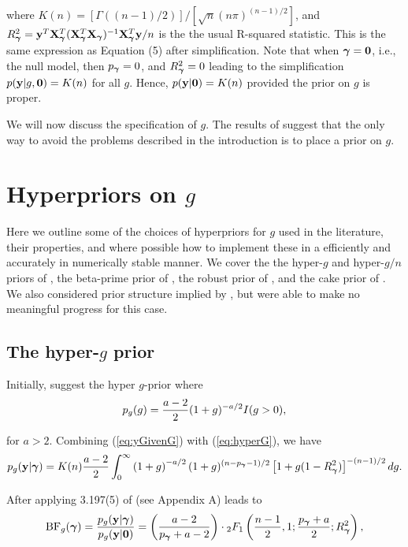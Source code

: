 \documentclass{article}[12pt]
\begin{document}
\noindent where $K(n) = [\Gamma( (n-1)/2 )]/[\sqrt{n}(n\pi)^{(n-1)/2}]$, and
$R_{\boldsymbol \gamma}^2 = {\bf y}^T{\bf X}_{\boldsymbol \gamma}^T({\bf X}_{\boldsymbol \gamma}^T{\bf X}_{\boldsymbol \gamma})^{-1}{\bf X}_{\boldsymbol \gamma}^T{\bf y}/n$ is 
the the usual R-squared statistic.
This is the same expression as \cite{Liang2008} Equation (5) 
after simplification. Note that
when ${\boldsymbol \gamma} = {\bf 0}$, i.e., the null model, then $p_{\boldsymbol \gamma} = 0$, and
$R_{\boldsymbol \gamma}^2 = 0$ leading to the simplification $p({\bf y}|g,{\bf 0}) = K(n)$
for all $g$. Hence, $p({\bf y}|{\bf 0}) = K(n)$ provided the prior on $g$ is proper.

We will now discuss the specification of $g$.
The results of \cite{Liang2008} suggest that the only way to 
avoid the problems described in the introduction is to place a prior on $g$.

\section{Hyperpriors on $g$}

Here we outline some of the choices of hyperpriors for $g$ used in the literature, their
properties, and where possible how to implement these in a efficiently and 
accurately in
numerically stable manner. We cover the 
the hyper-$g$ and hyper-$g/n$ priors of \cite{Liang2008}, the beta-prime prior
of \cite{Maruyama2011}, the robust prior of \cite{Bayarri2012}, and the cake
prior of \cite{OrmerodEtal2017}.
We also considered prior structure implied by \cite{Zellner1980}, but were able to make no
meaningful progress for this case.


\subsection{The hyper-$g$ prior}

Initially, \cite{Liang2008} suggest the hyper $g$-prior where
\begin{equation}\label{eq:hyperG}
\displaystyle p_{g}(g) = \frac{a - 2}{2}(1 + g)^{-a/2}I(g>0),
\end{equation}

\noindent for $a>2$. Combining (\ref{eq:yGivenG}) with (\ref{eq:hyperG}), we have
\begin{equation}\label{eq:hyperGmarginalIntegral}
p_{g}({\bf y}|{\boldsymbol \gamma}) = K(n) \frac{a - 2}{2}  \int_0^\infty 
\left( 1 + g \right)^{-a/2}
(1 + g)^{(n-p_{\boldsymbol \gamma}-1)/2} \left[ 1 + g (1 - R_{\boldsymbol \gamma}^2) \right]^{-(n-1)/2}  dg.
\end{equation}

\noindent After applying 
3.197(5) of \cite{Gradshteyn2007} (see Appendix A) leads to
\begin{equation}\label{eq:hyperGmarginal}
\displaystyle \mbox{BF}_{g}({\boldsymbol \gamma}) = \frac{p_{g}({\bf y}|{\boldsymbol \gamma})}{p_{g}({\bf y}|{\bf 0})} =  \left( \frac{a - 2}{p_{\boldsymbol \gamma} + a - 2} \right) \cdot {}_2F_1\left( \frac{n-1}{2}, 1; \frac{p_{\boldsymbol \gamma} + a}{2}; R_{\boldsymbol \gamma}^2 \right),
\end{equation}
\end{document}
